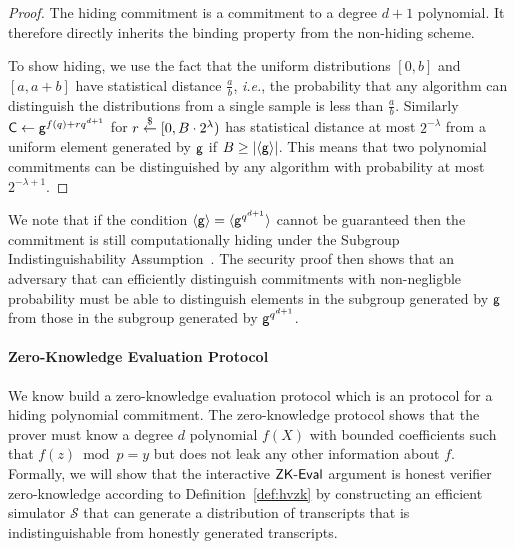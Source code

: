 \begin{proof}
The hiding commitment is a commitment to a degree $d+1$ polynomial. It therefore directly inherits the binding property from the non-hiding scheme.

To show hiding, we use the fact that the uniform distributions $[0,b]$ and $[a,a+b]$ have statistical distance $\frac{a}{b}$, \emph{i.e.}, the probability that any algorithm can distinguish the distributions from a single sample is less than $\frac{a}{b}$. Similarly $\mathsf{C}\gets\mathsf{g}^{f(q)+rq^{d+1}}$ for $r\overset{\$}{\gets}[0,B\cdot 2^{\lambda})$ has statistical distance at most $2^{-\lambda}$ from a uniform element generated by $\mathsf{g}$ if $B\geq |\langle \mathsf{g}\rangle|$. This means that two polynomial commitments can be distinguished by any algorithm with probability at most $2^{-\lambda+1}$.
\end{proof}
We note that if the condition $\langle \mathsf{g} \rangle = \langle \mathsf{g}^{q^{d+1}} \rangle$ cannot be guaranteed then the commitment is still computationally hiding under the Subgroup Indistinguishability Assumption~\cite{C:BraGol10}. The security proof then shows that an adversary that can efficiently distinguish commitments with non-negligble probability must be able to distinguish elements in the subgroup generated by $\mathsf{g}$ from those in the subgroup generated by $\mathsf{g}^{q^{d+1}}$.

\paragraph{Zero-Knowledge Evaluation Protocol}

We know build a zero-knowledge evaluation protocol which is an \eval protocol for a hiding polynomial commitment. The zero-knowledge protocol shows that the prover must know a degree $d$ polynomial $f(X)$ with bounded coefficients such that $f(z)\bmod p = y$ but does not leak any other information about $f$. Formally, we will show that the interactive $\textsf{{ZK-Eval}}$ argument is honest verifier zero-knowledge according to Definition~\ref{def:hvzk} by constructing an efficient simulator $\mathcal{S}$ that can generate a distribution of transcripts that is indistinguishable from honestly generated transcripts.

